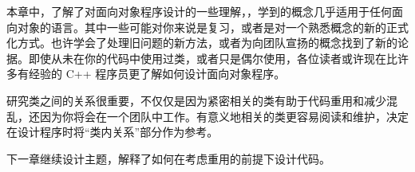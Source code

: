 本章中，了解了对面向对象程序设计的一些理解，，学到的概念几乎适用于任何面向对象的语言。其中一些可能对你来说是复习，或者是对一个熟悉概念的新的正式化方式。也许学会了处理旧问题的新方法，或者为向团队宣扬的概念找到了新的论据。即使从未在你的代码中使用过类，或者只是偶尔使用，各位读者或许现在比许多有经验的 C++ 程序员更了解如何设计面向对象程序。

研究类之间的关系很重要，不仅仅是因为紧密相关的类有助于代码重用和减少混乱，还因为你将会在一个团队中工作。有意义地相关的类更容易阅读和维护，决定在设计程序时将“类内关系”部分作为参考。

下一章继续设计主题，解释了如何在考虑重用的前提下设计代码。